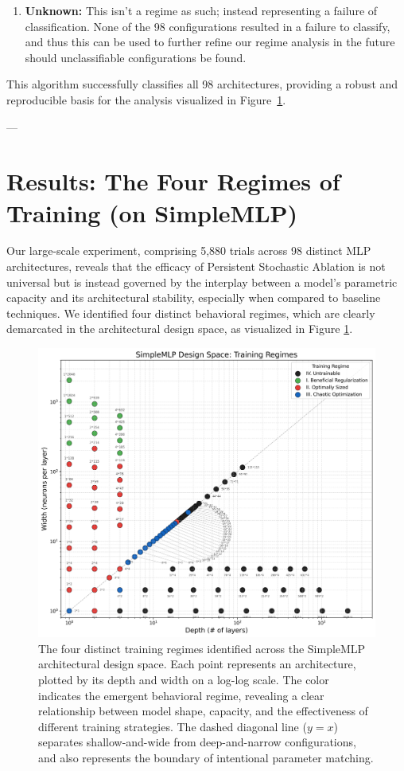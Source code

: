 \documentclass[conference]{IEEEtran}
\begin{document}
\begin{enumerate}
    \item \textbf{Unknown:} This isn't a regime as such; instead representing a failure of classification. None of the 98 configurations resulted in a failure to classify, and thus this can be used to further refine our regime analysis in the future should unclassifiable configurations be found.
\end{enumerate}

This algorithm successfully classifies all 98 architectures, providing a robust and reproducible basis for the analysis visualized in Figure~\ref{fig:regime_map}.

---

\section{Results: The Four Regimes of Training (on SimpleMLP)}
Our large-scale experiment, comprising 5,880 trials across 98 distinct MLP architectures, reveals that the efficacy of Persistent Stochastic Ablation is not universal but is instead governed by the interplay between a model's parametric capacity and its architectural stability, especially when compared to baseline techniques. We identified four distinct behavioral regimes, which are clearly demarcated in the architectural design space, as visualized in Figure \ref{fig:regime_map}.

\begin{figure}[ht]
\centering
\includegraphics[width=\textwidth]{SimpleMLP_Heatmap_Regimes.png}
\caption{The four distinct training regimes identified across the SimpleMLP architectural design space. Each point represents an architecture, plotted by its depth and width on a log-log scale. The color indicates the emergent behavioral regime, revealing a clear relationship between model shape, capacity, and the effectiveness of different training strategies. The dashed diagonal line ($y=x$) separates shallow-and-wide from deep-and-narrow configurations, and also represents the boundary of intentional parameter matching.}
\label{fig:regime_map}
\end{figure}
\end{document}
